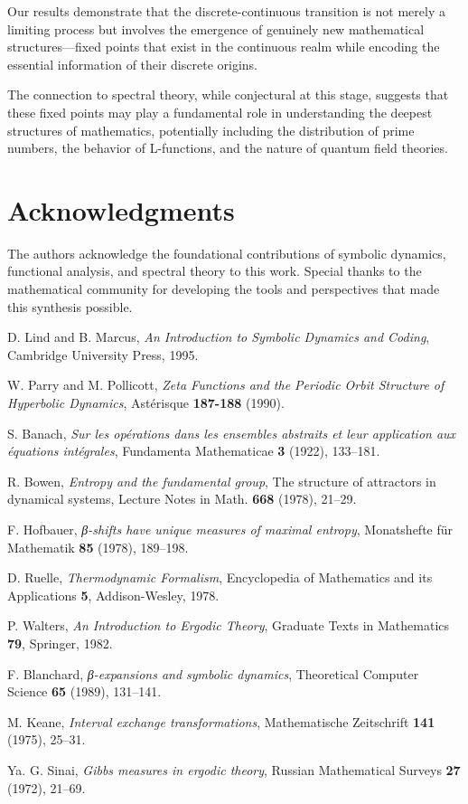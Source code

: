 \documentclass[12pt]{article}
\theoremstyle{plain}
\theoremstyle{definition}
\begin{document}
Our results demonstrate that the discrete-continuous transition is not merely a limiting process but involves the emergence of genuinely new mathematical structures—fixed points that exist in the continuous realm while encoding the essential information of their discrete origins.

The connection to spectral theory, while conjectural at this stage, suggests that these fixed points may play a fundamental role in understanding the deepest structures of mathematics, potentially including the distribution of prime numbers, the behavior of L-functions, and the nature of quantum field theories.

\section*{Acknowledgments}

The authors acknowledge the foundational contributions of symbolic dynamics, functional analysis, and spectral theory to this work. Special thanks to the mathematical community for developing the tools and perspectives that made this synthesis possible.

\begin{thebibliography}{99}

D. Lind and B. Marcus, \textit{An Introduction to Symbolic Dynamics and Coding}, Cambridge University Press, 1995.

W. Parry and M. Pollicott, \textit{Zeta Functions and the Periodic Orbit Structure of Hyperbolic Dynamics}, Astérisque \textbf{187-188} (1990).

S. Banach, \textit{Sur les opérations dans les ensembles abstraits et leur application aux équations intégrales}, Fundamenta Mathematicae \textbf{3} (1922), 133--181.

R. Bowen, \textit{Entropy and the fundamental group}, The structure of attractors in dynamical systems, Lecture Notes in Math. \textbf{668} (1978), 21--29.

F. Hofbauer, \textit{β-shifts have unique measures of maximal entropy}, Monatshefte für Mathematik \textbf{85} (1978), 189--198.

D. Ruelle, \textit{Thermodynamic Formalism}, Encyclopedia of Mathematics and its Applications \textbf{5}, Addison-Wesley, 1978.

P. Walters, \textit{An Introduction to Ergodic Theory}, Graduate Texts in Mathematics \textbf{79}, Springer, 1982.

F. Blanchard, \textit{β-expansions and symbolic dynamics}, Theoretical Computer Science \textbf{65} (1989), 131--141.

M. Keane, \textit{Interval exchange transformations}, Mathematische Zeitschrift \textbf{141} (1975), 25--31.

Ya. G. Sinai, \textit{Gibbs measures in ergodic theory}, Russian Mathematical Surveys \textbf{27} (1972), 21--69.

\end{thebibliography}
\end{document}
